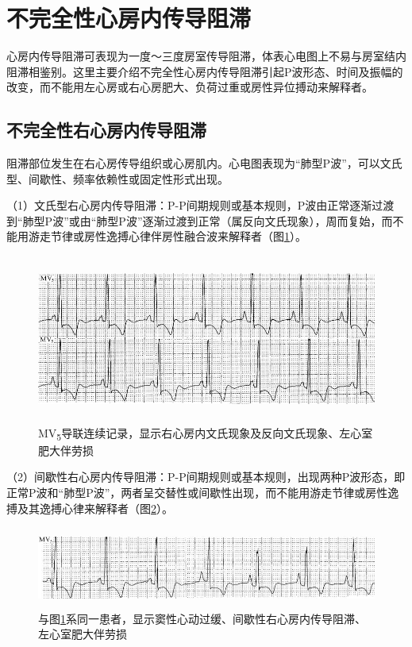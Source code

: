 \protect\hypertarget{text00026.htmlux5cux23subid314}{}{}

\section{不完全性心房内传导阻滞}

心房内传导阻滞可表现为一度～三度房室传导阻滞，体表心电图上不易与房室结内阻滞相鉴别。这里主要介绍不完全性心房内传导阻滞引起P波形态、时间及振幅的改变，而不能用左心房或右心房肥大、负荷过重或房性异位搏动来解释者。

\protect\hypertarget{text00026.htmlux5cux23subid315}{}{}

\subsection{不完全性右心房内传导阻滞}

阻滞部位发生在右心房传导组织或心房肌内。心电图表现为“肺型P波”，可以文氏型、间歇性、频率依赖性或固定性形式出现。

（1）文氏型右心房内传导阻滞：P-P间期规则或基本规则，P波由正常逐渐过渡到“肺型P波”或由“肺型P波”逐渐过渡到正常（属反向文氏现象），周而复始，而不能用游走节律或房性逸搏心律伴房性融合波来解释者（图\ref{fig19-1}）。

\begin{figure}[!htbp]
 \centering
 \includegraphics[width=5.58333in,height=2.17708in]{./images/Image00317.jpg}
 \captionsetup{justification=centering}
 \caption{MV\textsubscript{5}导联连续记录，显示右心房内文氏现象及反向文氏现象、左心室肥大伴劳损}
 \label{fig19-1}
  \end{figure} 


（2）间歇性右心房内传导阻滞：P-P间期规则或基本规则，出现两种P波形态，即正常P波和“肺型P波”，两者呈交替性或间歇性出现，而不能用游走节律或房性逸搏及其逸搏心律来解释者（图\ref{fig19-2}）。

\begin{figure}[!htbp]
 \centering
 \includegraphics[width=5.66667in,height=1.05208in]{./images/Image00318.jpg}
 \captionsetup{justification=centering}
 \caption{与图\ref{fig19-1}系同一患者，显示窦性心动过缓、间歇性右心房内传导阻滞、左心室肥大伴劳损}
 \label{fig19-2}
  \end{figure} 

